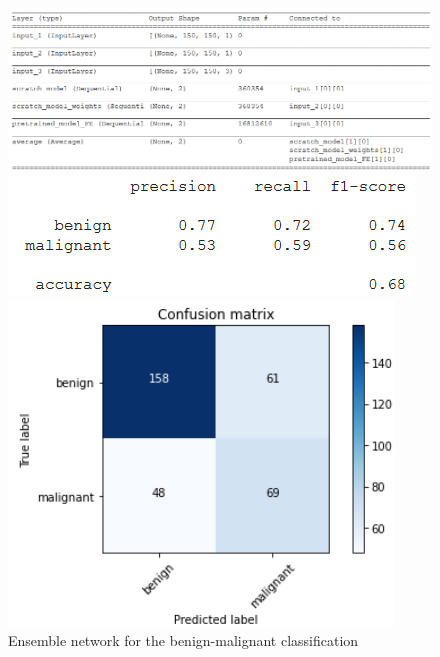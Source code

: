 \documentclass[11pt,a4paper,oneside]{article}
\begin{document}
\begin{figure}[h]
\centering
	\begin{minipage}[c]{.9\textwidth}
		\centering\setlength{\captionmargin}{0pt}%
		\includegraphics[width=.9\textwidth]{images/5/2_model}
		\caption{ Ensemble network for the benign-malignant classification}
	\end{minipage}
	\begin{minipage}[c]{.45\textwidth}
		\centering\setlength{\captionmargin}{0pt}%
		\includegraphics[width=.9\textwidth]{images/5/2_accuracy}
	\end{minipage}	
	\begin{minipage}[c]{.45\textwidth}
		\centering\setlength{\captionmargin}{0pt}%
		\includegraphics[width=.9\textwidth]{images/5/2_matrix}
	\end{minipage}
\end{figure}
\end{document}

